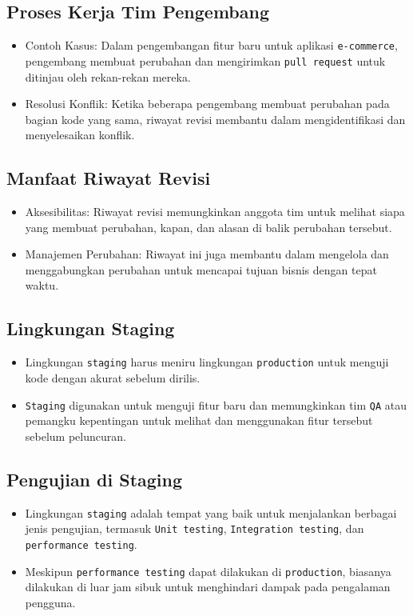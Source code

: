 \documentclass{article}
\begin{document}
\subsection{Proses Kerja Tim Pengembang}
\begin{itemize}
    \item Contoh Kasus: Dalam pengembangan fitur baru untuk aplikasi \texttt{e-commerce}, pengembang membuat perubahan dan mengirimkan \texttt{pull request} untuk ditinjau oleh rekan-rekan mereka.
    \item Resolusi Konflik: Ketika beberapa pengembang membuat perubahan pada bagian kode yang sama, riwayat revisi membantu dalam mengidentifikasi dan menyelesaikan konflik.
\end{itemize}

\subsection{Manfaat Riwayat Revisi}
\begin{itemize}
    \item Aksesibilitas: Riwayat revisi memungkinkan anggota tim untuk melihat siapa yang membuat perubahan, kapan, dan alasan di balik perubahan tersebut.
    \item Manajemen Perubahan: Riwayat ini juga membantu dalam mengelola dan menggabungkan perubahan untuk mencapai tujuan bisnis dengan tepat waktu.
\end{itemize}

\subsection{Lingkungan Staging}
\begin{itemize}
    \item Lingkungan \texttt{staging} harus meniru lingkungan \texttt{production} untuk menguji kode dengan akurat sebelum dirilis.
    \item \texttt{Staging} digunakan untuk menguji fitur baru dan memungkinkan tim \texttt{QA} atau pemangku kepentingan untuk melihat dan menggunakan fitur tersebut sebelum peluncuran.
\end{itemize}

\subsection{Pengujian di Staging}
\begin{itemize}
    \item Lingkungan \texttt{staging} adalah tempat yang baik untuk menjalankan berbagai jenis pengujian, termasuk \texttt{Unit testing}, \texttt{Integration testing}, dan \texttt{performance testing}.
    \item Meskipun \texttt{performance testing} dapat dilakukan di \texttt{production}, biasanya dilakukan di luar jam sibuk untuk menghindari dampak pada pengalaman pengguna.
\end{itemize}
\end{document}
